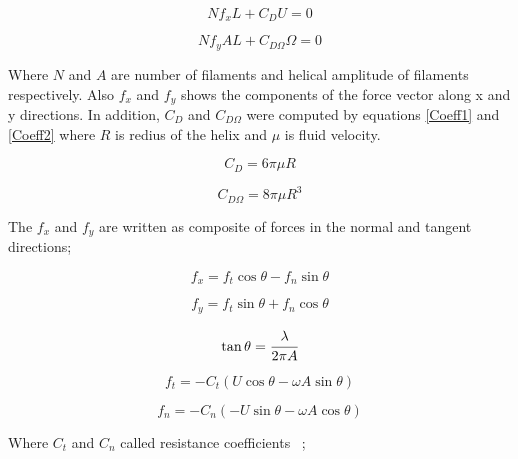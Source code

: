 \documentclass[12pt,a4paper,titlepage]{report}
\begin{document}
\begin{equation}
Nf_xL  + C_DU  = 0
\label{simple_thrust}
\end{equation}



\begin{equation}
 Nf_yAL + C_{D\Omega}\Omega= 0
\label{simple_torque}
\end{equation}

Where $N$ and $A$ are number of filaments and helical amplitude of filaments respectively. Also $f_x$ and 
$f_y$ shows the components of the force vector along x and y directions. In addition, $C_D$ and $C_{D\Omega}$
were computed by equations \ref{Coeff1} and \ref{Coeff2} where $R$ is redius of the helix and $\mu$ is fluid velocity.


\begin{equation}
 C_D  = 6 \pi \mu R
\label{Coeff1}
\end{equation}



\begin{equation}
 C_{D\Omega}= 8 \pi \mu R^3
\label{Coeff2}
\end{equation}

The $f_x$ and $f_y$ are written as composite of forces in the normal and tangent directions;

\begin{equation}
 f_x  = f_t\cos \theta - f_n\sin \theta
\label{normal}
\end{equation}



\begin{equation}
 f_y = f_t\sin \theta + f_n\cos \theta
\label{tangant}
\end{equation}

\begin{equation}
 \tan \theta  = \cfrac{\lambda}{2\pi A}
\label{tang}
\end{equation}



\begin{equation}
 f_t = -C_t(U \cos \theta - \omega A \sin \theta)
\label{normal_f}
\end{equation}



\begin{equation}
f_n = - C_n(-U \sin \theta - \omega A \cos \theta)
\label{tangant_f}
\end{equation}

Where $C_t$ and $C_n$ called resistance coefficients ~\citep{edd2003biomimetic};
 
\end{document}
